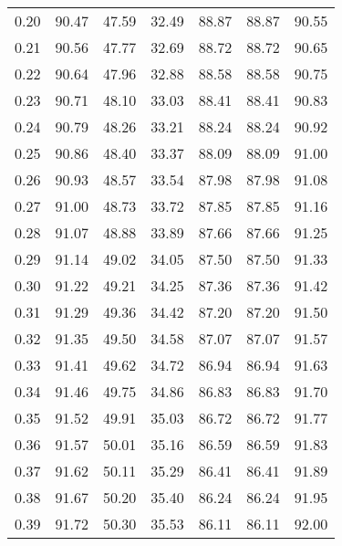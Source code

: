 \begin{tabular}{|c|c|c|c|c|c|c|}
      0.20 &     90.47 &     47.59 &      32.49 &   88.87 &      88.87 &         90.55 \\
      0.21 &     90.56 &     47.77 &      32.69 &   88.72 &      88.72 &         90.65 \\
      0.22 &     90.64 &     47.96 &      32.88 &   88.58 &      88.58 &         90.75 \\
      0.23 &     90.71 &     48.10 &      33.03 &   88.41 &      88.41 &         90.83 \\
      0.24 &     90.79 &     48.26 &      33.21 &   88.24 &      88.24 &         90.92 \\
      0.25 &     90.86 &     48.40 &      33.37 &   88.09 &      88.09 &         91.00 \\
      0.26 &     90.93 &     48.57 &      33.54 &   87.98 &      87.98 &         91.08 \\
      0.27 &     91.00 &     48.73 &      33.72 &   87.85 &      87.85 &         91.16 \\
      0.28 &     91.07 &     48.88 &      33.89 &   87.66 &      87.66 &         91.25 \\
      0.29 &     91.14 &     49.02 &      34.05 &   87.50 &      87.50 &         91.33 \\
      0.30 &     91.22 &     49.21 &      34.25 &   87.36 &      87.36 &         91.42 \\
      0.31 &     91.29 &     49.36 &      34.42 &   87.20 &      87.20 &         91.50 \\
      0.32 &     91.35 &     49.50 &      34.58 &   87.07 &      87.07 &         91.57 \\
      0.33 &     91.41 &     49.62 &      34.72 &   86.94 &      86.94 &         91.63 \\
      0.34 &     91.46 &     49.75 &      34.86 &   86.83 &      86.83 &         91.70 \\
      0.35 &     91.52 &     49.91 &      35.03 &   86.72 &      86.72 &         91.77 \\
      0.36 &     91.57 &     50.01 &      35.16 &   86.59 &      86.59 &         91.83 \\
      0.37 &     91.62 &     50.11 &      35.29 &   86.41 &      86.41 &         91.89 \\
      0.38 &     91.67 &     50.20 &      35.40 &   86.24 &      86.24 &         91.95 \\
      0.39 &     91.72 &     50.30 &      35.53 &   86.11 &      86.11 &         92.00 \\

\end{tabular}

